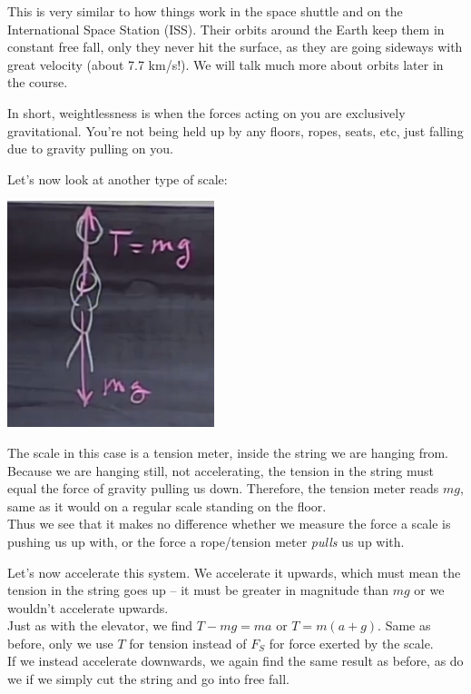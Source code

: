 \documentclass[8.01x]{subfiles}
\begin{document}
This is very similar to how things work in the space shuttle and on the International Space Station (ISS). Their orbits around the Earth keep them in constant free fall, only they never hit the surface, as they are going sideways with great velocity (about 7.7 km/s!). We will talk much more about orbits later in the course.

In short, weightlessness is when the forces acting on you are exclusively gravitational. You're not being held up by any floors, ropes, seats, etc, just falling due to gravity pulling on you.

Let's now look at another type of scale:

\begin{center}
\includegraphics[scale=0.8]{Graphics/lec7_hanging}
\end{center}

The scale in this case is a tension meter, inside the string we are hanging from. Because we are hanging still, not accelerating, the tension in the string must equal the force of gravity pulling us down. Therefore, the tension meter reads $m g$, same as it would on a regular scale standing on the floor.\\
Thus we see that it makes no difference whether we measure the force a scale is pushing us up with, or the force a rope/tension meter \emph{pulls} us up with.

Let's now accelerate this system. We accelerate it upwards, which must mean the tension in the string goes up -- it must be greater in magnitude than $m g$ or we wouldn't accelerate upwards.\\
Just as with the elevator, we find $T - m g = m a$ or $T = m(a + g)$. Same as before, only we use $T$ for tension instead of $F_S$ for force exerted by the scale.\\
If we instead accelerate downwards, we again find the same result as before, as do we if we simply cut the string and go into free fall.
\end{document}

